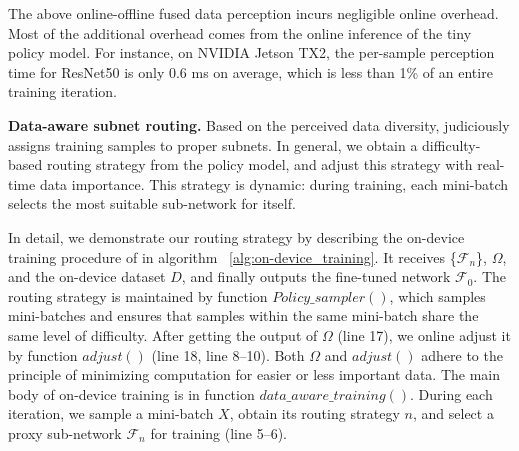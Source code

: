 The above online-offline fused data perception incurs negligible online overhead.
Most of the additional overhead comes from the online inference of the tiny policy model.
For instance, on NVIDIA Jetson TX2, the per-sample perception time for ResNet50 is only 0.6 ms on average, which is less than 1\% of an entire training iteration.





\noindent \textbf{Data-aware subnet routing.}
Based on the perceived data diversity, \sys judiciously assigns training samples to proper subnets.
In general, we obtain a difficulty-based routing strategy from the policy model, and adjust this strategy with real-time data importance.
This strategy is dynamic: during training, each mini-batch selects the most suitable sub-network for itself.

In detail, we demonstrate our routing strategy by describing the on-device training procedure of \sys in algorithm ~\ref{alg:on-device_training}.
It receives \{$\mathcal{F}_{n}$\}, $\Omega$, and the on-device dataset $D$, and finally outputs the fine-tuned network $\mathcal{F}_{0}$.
The routing strategy is maintained by function $Policy\_sampler()$, which samples mini-batches and ensures that samples within the same mini-batch share the same level of difficulty.
After getting the output of $\Omega$ (line 17), we online adjust it by function $adjust()$ (line 18, line 8--10).
Both $\Omega$ and $adjust()$ adhere to the principle of minimizing computation for easier or less important data.
The main body of on-device training is in function $data\_aware\_training()$.
During each iteration, we sample a mini-batch $X$, obtain its routing strategy $n$, and select a proxy sub-network $\mathcal{F}_{n}$ for training (line 5--6).



